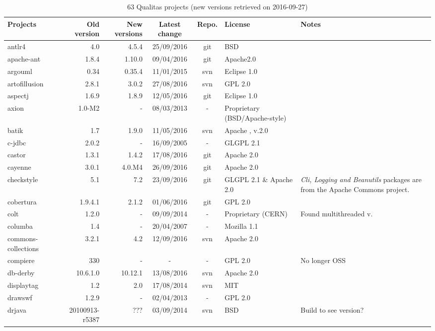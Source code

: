 \documentclass{sig-alternate-05-2015}
\begin{document}
\begin{table}
	\centering
	\caption{63 Qualitas projects (new versions retrieved on 2016-09-27)}
	\label{t:new_and_old}
	\small
		\begin{tabular}{l|r|r|c|c|p{3cm}|p{3cm}}
			\hline 
			Projects & Old version & New versions & Latest change & Repo. & License & Notes \\
			\hline
			antlr4 & 4.0 & 4.5.4 & 25/09/2016 & git & BSD \\
			apache-ant & 1.8.4 & 1.10.0 & 09/04/2016 & git & Apache2.0 \\
			argouml & 0.34 & 0.35.4 & 11/01/2015 	& svn & Eclipse  1.0 \\
			artofillusion & 2.8.1 & 3.0.2 & 27/08/2016 & svn & GPL 2.0 \\
			aspectj & 1.6.9 & 1.8.9 & 12/05/2016 & git & Eclipse   1.0 \\
			axion & 1.0-M2 & - & 08/03/2013 & - & Proprietary (BSD/Apache-style) \\
			batik & 1.7 & 1.9.0 & 11/05/2016 & svn & Apache , v.2.0 \\
			c-jdbc & 2.0.2 & - & 16/09/2005 & - & GLGPL 2.1 \\
			castor & 1.3.1 & 1.4.2 & 17/08/2016 & git & Apache 2.0 \\
			cayenne & 3.0.1 & 4.0.M4 &  26/09/2016 & git & Apache 2.0 \\
			checkstyle & 5.1 & 7.2  & 23/09/2016 & git & GLGPL 2.1 \& Apache 2.0 & \textit{Cli, Logging and Beanutils} packages are from the Apache Commons project. \\
			cobertura & 1.9.4.1 & 2.1.2 & 01/06/2016 & git & GPL 2.0  \\
			colt & 1.2.0 & - & 09/09/2014 & - & Proprietary (CERN) & Found multithreaded v. \\
			columba & 1.4 & - & 20/04/2007 & - & Mozilla   1.1  \\
			commons-collections & 3.2.1 & 4.2 & 12/09/2016 & svn & Apache 2.0 \\
			compiere & 330 & - & - & - & GPL 2.0 & No longer OSS \\
			db-derby & 10.6.1.0 & 10.12.1 & 13/08/2016 & svn & Apache 2.0 \\
			displaytag & 1.2 & 2.0 & 17/08/2014 & svn & MIT  \\
			drawswf & 1.2.9 & - & 02/04/2013 & - & GPL 2.0 \\
			drjava & 20100913-r5387 & ??? & 03/09/2014 & svn & BSD  & Build to see version? \\

\end{tabular}
\end{table}
\end{document}

